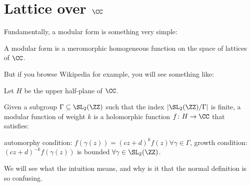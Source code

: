 \chapter{Lattice over $\CC$}


Fundamentally, a modular form is something very simple:

\begin{moral}
	A modular form is a meromorphic homogeneous function on the space of lattices of $\CC$.
\end{moral}


But if you browse Wikipedia for example, you will see something like:
\begin{definition}
	Let $H$ be the upper half-plane of $\CC$.

	Given a subgroup $\Gamma \subseteq \SL_2(\ZZ)$ such that the index $|\SL_2(\ZZ)/\Gamma|$
	is finite, a modular function of weight $k$ is a holomorphic function $f\colon H \to \CC$
	that satisfies:
	\begin{itemize}
		\ii automorphy condition: $f(\gamma(z)) = (cz+d)^k f(z) \forall \gamma \in \Gamma$,
		\ii growth condition: $(cz+d)^{-k} f(\gamma(z))$ is bounded $\forall \gamma \in \SL_2(\ZZ)$.
	\end{itemize}
\end{definition}

We will see what the intuition means, and why is it that the normal definition is so confusing.

